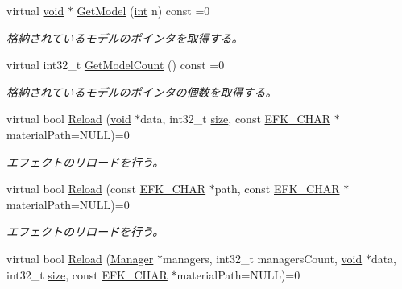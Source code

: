 \begin{DoxyCompactItemize}
virtual \mbox{\hyperlink{namespace_effekseer_ab34c4088e512200cf4c2716f168deb56}{void}} $\ast$ \mbox{\hyperlink{class_effekseer_1_1_effect_ac54d6933252509f588a1332187136a1e}{Get\+Model}} (\mbox{\hyperlink{namespace_effekseer_ace0abf7c2e6947e519ebe8b54cbcc30a}{int}} n) const =0
\begin{DoxyCompactList}\small\item\em 格納されているモデルのポインタを取得する。 \end{DoxyCompactList}\item 
virtual int32\+\_\+t \mbox{\hyperlink{class_effekseer_1_1_effect_a2f080f7b32e11b7ea2a31744b69cefea}{Get\+Model\+Count}} () const =0
\begin{DoxyCompactList}\small\item\em 格納されているモデルのポインタの個数を取得する。 \end{DoxyCompactList}\item 
virtual bool \mbox{\hyperlink{class_effekseer_1_1_effect_a32c3c8d5a582f7ebaad34b1fb32e6d70}{Reload}} (\mbox{\hyperlink{namespace_effekseer_ab34c4088e512200cf4c2716f168deb56}{void}} $\ast$data, int32\+\_\+t \mbox{\hyperlink{namespace_effekseer_a73c68f3d33539d30844b9d1e058077f7}{size}}, const \mbox{\hyperlink{_effekseer_8h_a50b026abea014b47854bcd835b3b6233}{E\+F\+K\+\_\+\+C\+H\+AR}} $\ast$material\+Path=N\+U\+LL)=0
\begin{DoxyCompactList}\small\item\em エフェクトのリロードを行う。 \end{DoxyCompactList}\item 
virtual bool \mbox{\hyperlink{class_effekseer_1_1_effect_acd86f6147154097e727246f7671d99ef}{Reload}} (const \mbox{\hyperlink{_effekseer_8h_a50b026abea014b47854bcd835b3b6233}{E\+F\+K\+\_\+\+C\+H\+AR}} $\ast$path, const \mbox{\hyperlink{_effekseer_8h_a50b026abea014b47854bcd835b3b6233}{E\+F\+K\+\_\+\+C\+H\+AR}} $\ast$material\+Path=N\+U\+LL)=0
\begin{DoxyCompactList}\small\item\em エフェクトのリロードを行う。 \end{DoxyCompactList}\item 
virtual bool \mbox{\hyperlink{class_effekseer_1_1_effect_a3159f076cc1c4201287c36867d5e1566}{Reload}} (\mbox{\hyperlink{class_effekseer_1_1_manager}{Manager}} $\ast$managers, int32\+\_\+t managers\+Count, \mbox{\hyperlink{namespace_effekseer_ab34c4088e512200cf4c2716f168deb56}{void}} $\ast$data, int32\+\_\+t \mbox{\hyperlink{namespace_effekseer_a73c68f3d33539d30844b9d1e058077f7}{size}}, const \mbox{\hyperlink{_effekseer_8h_a50b026abea014b47854bcd835b3b6233}{E\+F\+K\+\_\+\+C\+H\+AR}} $\ast$material\+Path=N\+U\+LL)=0

\end{DoxyCompactItemize}
